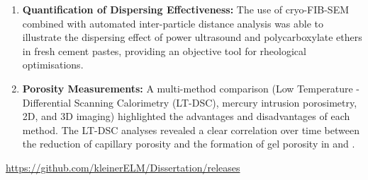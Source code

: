 \documentclass[11pt, a4paper]{article}
\begin{document}
\begin{enumerate}[label=\textbf{\arabic*.}, leftmargin=1.5cm, labelsep=0.5cm, itemsep=0.5em, resume]
    \item \textbf{Quantification of Dispersing Effectiveness:} The use of cryo-FIB-SEM combined with automated inter-particle distance analysis was able to illustrate the dispersing effect of power ultrasound and polycarboxylate ethers in fresh cement pastes, providing an objective tool for rheological optimisations.
    \item \textbf{Porosity Measurements:} A multi-method comparison (Low Temperature - Differential Scanning Calorimetry (LT-DSC), mercury intrusion porosimetry, 2D, and 3D imaging) highlighted the advantages and disadvantages of each method. The LT-DSC analyses revealed a clear correlation over time between the reduction of capillary porosity and the formation of gel porosity in  and .
\end{enumerate}

\vfill
\begin{center}
    \hspace*{.5cm}\url{https://github.com/kleinerELM/Dissertation/releases}
\end{center}
\end{document}
